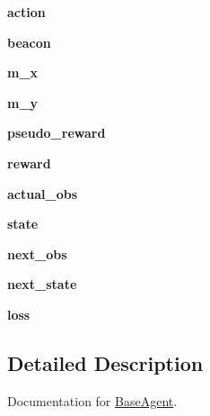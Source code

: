 \begin{DoxyCompactItemize}
{\bfseries action}
\item 
\mbox{\label{classAgency_1_1BaseAgent_a63134b494c76d05c1368abba3cefad16}} 
{\bfseries beacon}
\item 
\mbox{\label{classAgency_1_1BaseAgent_ae35f3a8539b94d37bdd0e401f1fe8349}} 
{\bfseries m\+\_\+x}
\item 
\mbox{\label{classAgency_1_1BaseAgent_a4809237727e0865b7a47b0cd71525ef6}} 
{\bfseries m\+\_\+y}
\item 
\mbox{\label{classAgency_1_1BaseAgent_abdaf34c55cf5c82b49b0b6592380e3e1}} 
{\bfseries pseudo\+\_\+reward}
\item 
\mbox{\label{classAgency_1_1BaseAgent_a4b3bda54eb9c1193f6ede50f32e95a2d}} 
{\bfseries reward}
\item 
\mbox{\label{classAgency_1_1BaseAgent_abeb097dc014891c983b8cb5b993cb624}} 
{\bfseries actual\+\_\+obs}
\item 
\mbox{\label{classAgency_1_1BaseAgent_ad1ba1f291bc8f4360668c8e02186f83a}} 
{\bfseries state}
\item 
\mbox{\label{classAgency_1_1BaseAgent_a27248be7da0c8a830b7a7e60a4c96344}} 
{\bfseries next\+\_\+obs}
\item 
\mbox{\label{classAgency_1_1BaseAgent_a63181f746aea31b031c03050f2c4996f}} 
{\bfseries next\+\_\+state}
\item 
\mbox{\label{classAgency_1_1BaseAgent_ab36391d460027de65f3cbea93af9d86c}} 
{\bfseries loss}
\end{DoxyCompactItemize}


\subsection{Detailed Description}
Documentation for \mbox{\hyperlink{classAgency_1_1BaseAgent}{Base\+Agent}}. 

